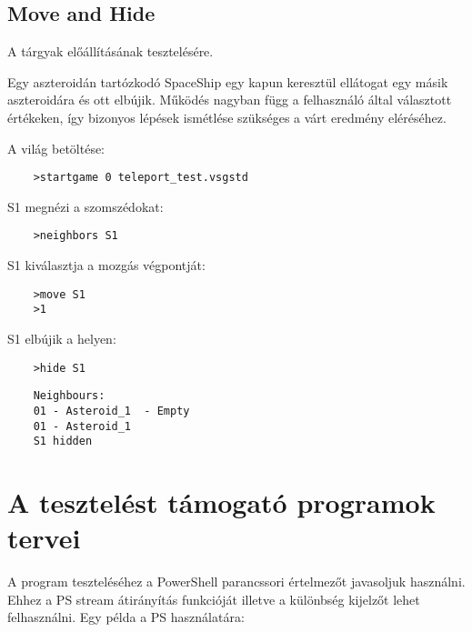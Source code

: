 \documentclass[../../projlab]{subfiles}
\begin{document}
\subsection{Move and Hide}
\begin{test-case-description}
    A tárgyak előállításának tesztelésére.
\end{test-case-description}
\begin{test-case-function}
    Egy aszteroidán tartózkodó SpaceShip egy kapun keresztül ellátogat egy másik aszteroidára és ott elbújik. \newline
    Működés nagyban függ a felhasználó által választott értékeken, így bizonyos lépések ismétlése szükséges a várt eredmény eléréséhez.
\end{test-case-function}
\begin{test-case-input}

    A világ betöltése: 
    \begin{verbatim}
    >startgame 0 teleport_test.vsgstd
    \end{verbatim}
    S1 megnézi a szomszédokat:
    \begin{verbatim}
    >neighbors S1
    \end{verbatim}
    S1 kiválasztja a mozgás végpontját:
    \begin{verbatim}
    >move S1
    >1
    \end{verbatim}
    S1 elbújik a helyen:
    \begin{verbatim}
    >hide S1
    \end{verbatim}
\end{test-case-input}
\begin{test-case-output}
\begin{verbatim}
    Neighbours:
    01 - Asteroid_1  - Empty
    01 - Asteroid_1
    S1 hidden
\end{verbatim}
\end{test-case-output}

\section{A tesztelést támogató programok tervei}
A program teszteléséhez a PowerShell parancssori értelmezőt javasoljuk használni.
Ehhez a PS stream átirányítás funkcióját illetve a különbség kijelzőt lehet felhasználni.
Egy példa a PS használatára:
\end{document}
